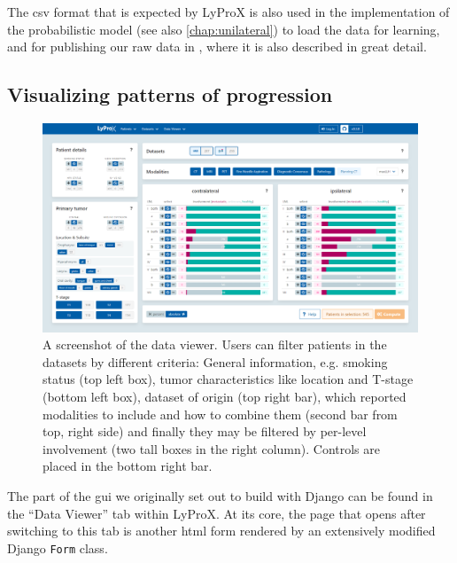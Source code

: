 \documentclass[\relativeRoot/main.tex]{subfiles}
\begin{document}
The \gls{csv} format that is expected by LyProX is also used in the implementation of the probabilistic  model (see also  \cref{chap:unilateral}) to load the data for learning, and for publishing our raw data in , where it is also described in great detail.

\subsection*{Visualizing patterns of progression}
\label{subsec:lyprox:implementation:viewer}

\begin{figure}
    \centering
    \includegraphics[width=1.0\textwidth, frame]{figures/data_viewer.png}
    \caption[
        Screenshot of the data viewer dashboard
    ]{
        A screenshot of the data viewer. Users can filter patients in the datasets by different criteria: General information, e.g. smoking status (top left box), tumor characteristics like location and T-stage (bottom left box), dataset of origin (top right bar), which reported modalities to include and how to combine them (second bar from top, right side) and finally they may be filtered by per-level involvement (two tall boxes in the right column). Controls are placed in the bottom right bar.
    }
    \label{fig:lyprox:data_viewer}
\end{figure}

The part of the \gls{gui} we originally set out to build with Django can be found in the ``Data Viewer'' tab within LyProX. At its core, the page that opens after switching to this tab is another \acrshort{html} form rendered by an extensively modified Django \texttt{Form} class.
\end{document}
